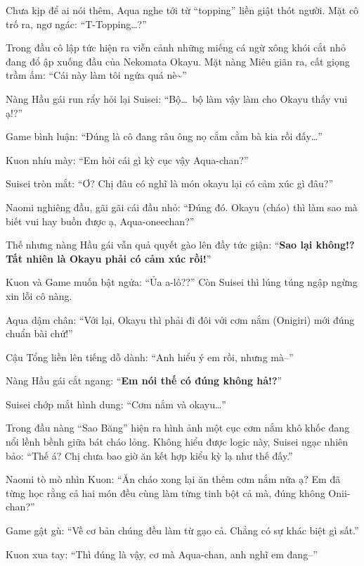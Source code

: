 \documentclass[../main.tex]{subfiles}
\begin{document}
Chưa kịp để ai nói thêm, Aqua nghe tới từ ``topping'' liền giật thót người. Mặt cô trố ra, ngơ ngác: ``T-Topping\dots?''

Trong đầu cô lập tức hiện ra viễn cảnh những miếng cá ngừ xông khói cắt nhỏ đang đổ ập xuống đầu của Nekomata Okayu. Mặt nàng Miêu giãn ra, cất giọng trầm ấm: ``Cái này làm tôi ngứa quá nè\~{}''


Nàng Hầu gái run rẩy hỏi lại Suisei: ``Bộ\dots\ bộ làm vậy làm cho Okayu thấy vui ạ!?''

Game bình luận: ``Đúng là cô đang râu ông nọ cắm cằm bà kia rồi đấy\dots''

Kuon nhíu mày: ``Em hỏi cái gì kỳ cục vậy Aqua-chan?''

Suisei tròn mắt: ``Ơ? Chị đâu có nghĩ là món okayu lại có cảm xúc gì đâu?''

Naomi nghiêng đầu, gãi gãi cái đầu nhỏ: ``Đúng đó. Okayu (cháo) thì làm sao mà biết vui hay buồn được ạ, Aqua-oneechan?''

Thế nhưng nàng Hầu gái vẫn quả quyết gào lên đầy tức giận: ``\textbf{Sao lại không!? Tất nhiên là Okayu phải có cảm xúc rồi!}''


Kuon và Game muốn bật ngửa: ``Ủa a-lô??'' Còn Suisei thì lúng túng ngập ngừng xin lỗi cô nàng.

Aqua dậm chân: ``Với lại, Okayu thì phải đi đôi với cơm nắm (Onigiri) mới đúng chuẩn bài chứ!''

Cậu Tổng liền lên tiếng dỗ dành: ``Anh hiểu ý em rồi, nhưng mà--''

Nàng Hầu gái cắt ngang: ``\textbf{Em nói thế có đúng không hả!?}''

Suisei chớp mắt hình dung: ``Cơm nắm và okayu\dots''

Trong đầu nàng ``Sao Băng'' hiện ra hình ảnh một cục cơm nắm khô khốc đang nổi lềnh bềnh giữa bát cháo lỏng. Không hiểu được logic này, Suisei ngạc nhiên bảo: ``Thế á? Chị chưa bao giờ ăn kết hợp kiểu kỳ lạ như thế đấy.''


Naomi tò mò nhìn Kuon: ``Ăn cháo xong lại ăn thêm cơm nắm nữa ạ? Em đã từng học rằng cả hai món đều cùng làm từng tinh bột cả mà, đúng không Onii-chan?''

Game gật gù: ``Về cơ bản chúng đều làm từ gạo cả. Chẳng có sự khác biệt gì sất.''

Kuon xua tay: ``Thì đúng là vậy, cơ mà Aqua-chan, anh nghĩ em đang--''
\end{document}
